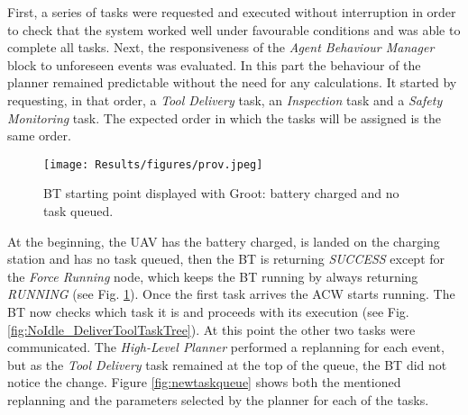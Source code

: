 First, a series of tasks were requested and executed without interruption in order to check that the system worked well under favourable conditions and was able to complete all tasks. Next, the responsiveness of the \emph{Agent Behaviour Manager} block to unforeseen events was evaluated. In this part the behaviour of the planner remained predictable without the need for any calculations. It started by requesting, in that order, a \emph{Tool Delivery} task, an \emph{Inspection} task and a \emph{Safety Monitoring} task. The expected order in which the tasks will be assigned is the same order.


\begin{figure}[htbp]
    \centering
    \texttt{[image: Results/figures/prov.jpeg]}
    \caption{\gls{BT} starting point displayed with Groot: battery charged and no task queued.}
    \label{fig:BTinitialization}
\end{figure}

At the beginning, the \gls{UAV} has the battery charged, is landed on the charging station and has no task queued, then the \gls{BT} is returning \emph{SUCCESS} except for the \emph{Force Running} node, which keeps the \gls{BT} running by always returning \emph{RUNNING} (see Fig. \ref{fig:BTinitialization}). Once the first task arrives the \gls{ACW} starts running. The \gls{BT} now checks which task it is and proceeds with its execution (see Fig. \ref{fig:NoIdle_DeliverToolTaskTree}). At this point the other two tasks were communicated. The \emph{High-Level Planner} performed a replanning for each event, but as the \emph{Tool Delivery} task remained at the top of the queue, the \gls{BT} did not notice the change. Figure \ref{fig:newtaskqueue} shows both the mentioned replanning and the parameters selected by the planner for each of the tasks.

